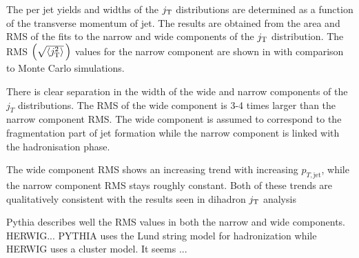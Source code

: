 
The per jet yields and widths of the $j_{\rm T}$ distributions are determined as a function of the transverse momentum of jet. The results are obtained from the area and RMS of the fits to the narrow and wide components of the $j_{\rm T}$ distribution. The RMS $\left(\sqrt{\left<j_{\rm T}^2\right>}\,\right)$ values for the narrow component are shown in  with comparison to Monte Carlo simulations. 

There is clear separation in the width of the wide and narrow components of the $j_T$ distributions. The RMS of the wide component is 3-4 times larger than the narrow component RMS. The wide component is assumed to correspond to the fragmentation part of jet formation while the narrow component is linked with the hadronisation phase.

The wide component RMS shows an increasing trend with increasing $p_{T,\mathrm{jet}}$, while the narrow component RMS stays roughly constant. Both of these trends are qualitatively consistent with the results seen in dihadron $j_{\rm T}$ analysis~\cite{ALICEjt}

Pythia describes well the RMS values in both the narrow and wide components. HERWIG... PYTHIA uses the Lund string model for hadronization while HERWIG uses a cluster model. It seems ...



